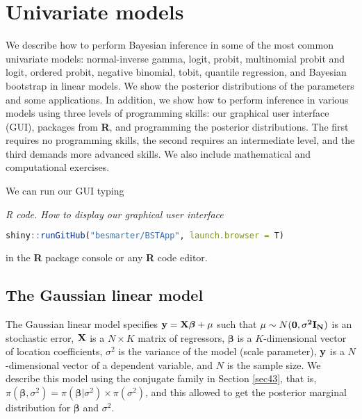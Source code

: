 \chapter{Univariate models}\label{chap6}

We describe how to perform Bayesian inference in some of the most common univariate models: normal-inverse gamma, logit, probit, multinomial probit and logit, ordered probit, negative binomial, tobit, quantile regression, and Bayesian bootstrap in linear models. We show the posterior distributions of the parameters and some applications. In addition, we show how to perform inference in various models using three levels of programming skills: our graphical user interface (GUI), packages from \textbf{R}, and programming the posterior distributions. The first requires no programming skills, the second requires an intermediate level, and the third demands more advanced skills. We also include mathematical and computational exercises.

We can run our GUI typing

\begin{tcolorbox}[enhanced,width=4.67in,center upper,
	fontupper=\large\bfseries,drop shadow southwest,sharp corners]
	\textit{R code. How to display our graphical user interface}
	\begin{VF}
		\begin{lstlisting}[language=R]
	shiny::runGitHub("besmarter/BSTApp", launch.browser = T)
\end{lstlisting}
	\end{VF}
\end{tcolorbox} 

in the \textbf{R} package console or any \textbf{R} code editor.

\section{The Gaussian linear model}\label{sec61}

The Gaussian linear model specifies ${\bf{y}}={\bf{X}}\bm{\bm{\beta}}+\bf{\mu}$ such that $\mu\sim N(\bf{0},\sigma^2\bf{I}_N)$ is an stochastic error, ${\bf{X}}$ is a $N \times K$ matrix of regressors, $\bm{\bm{\beta}}$ is a $K$-dimensional vector of location coefficients, $\sigma^2$ is the variance of the model (scale parameter), ${\bf{y}}$ is a $N$-dimensional vector of a dependent variable, and $N$ is the sample size. We describe this model using the conjugate family in Section \ref{sec43}, that is, $\pi(\bm{\bm{\beta}},\sigma^2)=\pi(\bm{\bm{\beta}}|\sigma^2)\times\pi(\sigma^2)$, and this allowed to get the posterior marginal distribution for $\bm{\bm{\beta}}$ and $\sigma^2$.

